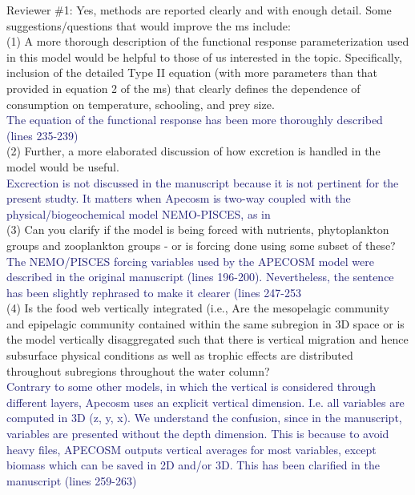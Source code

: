 \documentclass[12pt]{article}
\newcommand{\resp}[1]{\textcolor{MidnightBlue}{#1}}
\begin{document}
Reviewer \#1: Yes, methods are reported clearly and with enough detail. Some suggestions/questions that would improve the ms include: \\

(1) A more thorough description of the functional response parameterization used in this model would be helpful to those of us interested in the topic. Specifically, inclusion of the detailed Type II equation (with more parameters than that provided in equation 2 of the ms) that clearly defines the dependence of consumption on temperature, schooling, and prey size. \\

\resp{The equation of the functional response has been more thoroughly described (lines 235-239)}\\

(2) Further, a more elaborated discussion of how excretion is handled in the model would be useful. \\ 

\resp{Excrection is not discussed in the manuscript because it is not pertinent for the present studty. It matters 
when Apecosm is two-way coupled with the physical/biogeochemical model NEMO-PISCES, as in \cite{aumontEvaluatingPotentialImpacts2018a, lemezoNaturalVariabilityMarine2016, dupontHighTrophicLevel2023}} \\

(3) Can you clarify if the model is being forced with nutrients, phytoplankton groups and zooplankton groups - or is forcing done using some subset of these? \\

\resp{The NEMO/PISCES forcing variables used by the APECOSM model were described in the original manuscript (lines  196-200). Nevertheless, the sentence has been slightly rephrased to make it clearer (lines 247-253}\\

(4) Is the food web vertically integrated (i.e., Are the mesopelagic community and epipelagic community contained within the same subregion in 3D space or is the model vertically disaggregated such that there is vertical migration and hence subsurface physical conditions as well as trophic effects are distributed throughout subregions throughout the water column? \\ 

\resp{Contrary to some other models, in which the vertical is considered through different layers, Apecosm uses an explicit vertical dimension. I.e. all variables are computed in 3D (z, y, x). We understand the confusion, since in the manuscript, variables are presented without the depth dimension. This is because to avoid heavy files, APECOSM outputs vertical averages for most variables, except biomass which can be saved in 2D and/or 3D. This has been clarified in the manuscript (lines 259-263)}\\
\end{document}
